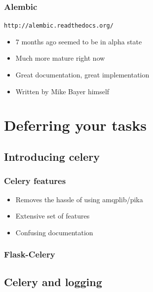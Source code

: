 \documentclass[14pt]{beamer}
\begin{document}
\begin{frame}
  \frametitle{Alembic}
  \texttt{http://alembic.readthedocs.org/}
  \begin{itemize}
  \item 7 months ago seemed to be in alpha state
  \item Much more mature right now
  \item Great documentation, great implementation
  \item Written by Mike Bayer himself
  \end{itemize}
\end{frame}

\section{Deferring your tasks}

\subsection{Introducing celery}

\begin{frame}
  \frametitle{Celery features}
  \begin{itemize}
  \item Removes the hassle of using amqplib/pika
  \item Extensive set of features
  \item Confusing documentation
  \end{itemize}
\end{frame}

\begin{frame}
  \frametitle{Flask-Celery}
\end{frame}


\subsection{Celery and logging}
\end{document}
